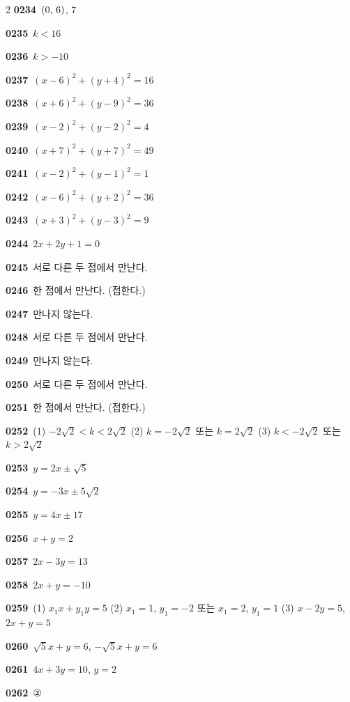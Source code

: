 \documentclass[10pt,a4paper]{article}
\begin{document}
\begin{multicols}{2}
\noindent\textbf{0234}\ $(0,\mkern3mu 6)$, $7$\par
\noindent\textbf{0235}\ $k<16$\par
\noindent\textbf{0236}\ $k>-10$\par
\noindent\textbf{0237}\ $(x-6)^2+(y+4)^2=16$\par
\noindent\textbf{0238}\ $(x+6)^2+(y-9)^2=36$\par
\noindent\textbf{0239}\ $(x-2)^2+(y-2)^2=4$\par
\noindent\textbf{0240}\ $(x+7)^2+(y+7)^2=49$\par
\noindent\textbf{0241}\ $(x-2)^2+(y-1)^2=1$\par
\noindent\textbf{0242}\ $(x-6)^2+(y+2)^2=36$\par
\noindent\textbf{0243}\ $(x+3)^2+(y-3)^2=9$\par
\noindent\textbf{0244}\ $2x+2y+1=0$\par
\noindent\textbf{0245}\ 서로 다른 두 점에서 만난다.\par
\noindent\textbf{0246}\ 한 점에서 만난다. (접한다.)\par
\noindent\textbf{0247}\ 만나지 않는다.\par
\noindent\textbf{0248}\ 서로 다른 두 점에서 만난다.\par
\noindent\textbf{0249}\ 만나지 않는다.\par
\noindent\textbf{0250}\ 서로 다른 두 점에서 만난다.\par
\noindent\textbf{0251}\ 한 점에서 만난다. (접한다.)\par
\noindent\textbf{0252}\ (1) $-2\sqrt{2}<k<2\sqrt{2}$ (2) $k=-2\sqrt{2}$ 또는 $k=2\sqrt{2}$ (3) $k<-2\sqrt{2}$ 또는 $k>2\sqrt{2}$\par
\noindent\textbf{0253}\ $y=2x\pm\sqrt{5}$\par
\noindent\textbf{0254}\ $y=-3x\pm 5\sqrt{2}$\par
\noindent\textbf{0255}\ $y=4x\pm 17$\par
\noindent\textbf{0256}\ $x+y=2$\par
\noindent\textbf{0257}\ $2x-3y=13$\par
\noindent\textbf{0258}\ $2x+y=-10$\par
\noindent\textbf{0259}\ (1) $x_1x+y_1y=5$ (2) $x_1=1$, $y_1=-2$ 또는 $x_1=2$, $y_1=1$ (3) $x-2y=5$, $2x+y=5$\par
\noindent\textbf{0260}\ $\sqrt{5}x+y=6$, $-\sqrt{5}x+y=6$\par
\noindent\textbf{0261}\ $4x+3y=10$, $y=2$\par
\noindent\textbf{0262}\ ②\par

\end{multicols}
\end{document}

